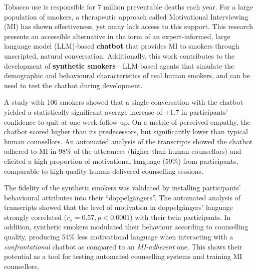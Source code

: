 Tobacco use is responsible for 7 million preventable deaths each year. For a large population of smokers, a therapeutic approach called Motivational Interviewing (MI) has shown effectiveness, yet many lack access to this support. This research presents an accessible alternative in the form of an expert-informed, large language model (LLM)-based \textbf{chatbot} that provides MI to smokers through unscripted, natural conversation. Additionally, this work contributes to the development of \textbf{synthetic smokers}---LLM-based agents that simulate the demographic and behavioural characteristics of real human smokers, and can be used to test the chatbot during development.

A study with 106 smokers showed that a single conversation with the chatbot yielded a statistically significant average increase of +1.7 in participants' confidence to quit at one-week follow-up. On a metric of perceived empathy, the chatbot scored higher than its predecessors, but significantly lower than typical human counsellors. An automated analysis of the transcripts showed the chatbot adhered to MI in 98\% of the utterances (higher than human counsellors) and elicited a high proportion of motivational language (59\%) from participants, comparable to high-quality human-delivered counselling sessions.

The fidelity of the synthetic smokers was validated by installing participants' behavioural attributes into their ``doppelgängers''. The automated analysis of transcripts showed that the level of motivation in doppelgängers' language strongly correlated ($r_{s}=0.57, p < 0.0001$) with their twin participants. In addition, synthetic smokers modulated their behaviour according to counselling quality, producing 54\% less motivational language when interacting with a \emph{confrontational} chatbot as compared to an \emph{MI-adherent} one. This shows their potential as a tool for testing automated counselling systems and training MI counsellors.
